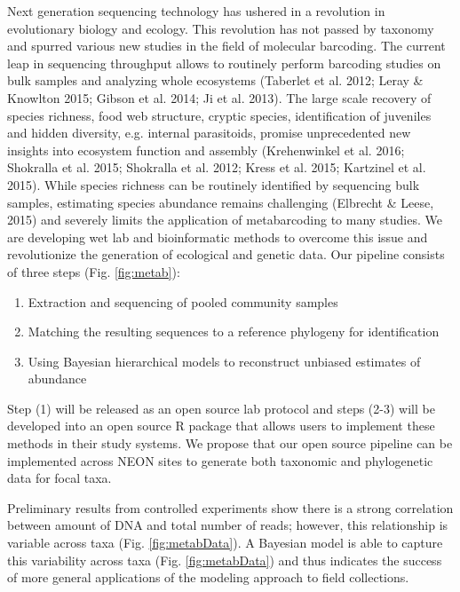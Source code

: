 \documentclass[11pt]{article}
\begin{document}
Next generation sequencing technology has ushered in a revolution in
evolutionary biology and ecology. This revolution has not passed by
taxonomy and spurred various new studies in the field of molecular
barcoding. The current leap in sequencing throughput allows to
routinely perform barcoding studies on bulk samples and analyzing
whole ecosystems (Taberlet et al. 2012; Leray \& Knowlton 2015; Gibson
et al. 2014; Ji et al. 2013). The large scale recovery of species
richness, food web structure, cryptic species, identification of
juveniles and hidden diversity, e.g. internal parasitoids, promise
unprecedented new insights into ecosystem function and assembly
(Krehenwinkel et al. 2016; Shokralla et al. 2015; Shokralla et
al. 2012; Kress et al. 2015; Kartzinel et al. 2015). While species
richness can be routinely identified by sequencing bulk samples,
estimating species abundance remains challenging (Elbrecht \& Leese,
2015) and severely limits the application of metabarcoding to many
studies. We are developing wet lab and bioinformatic methods to
overcome this issue and revolutionize the generation of ecological and
genetic data. Our pipeline consists of three steps
(Fig. \ref{fig:metab}):

\begin{enumerate}
\item Extraction and sequencing of pooled community samples
\item Matching the resulting sequences to a reference phylogeny for
  identification
\item Using Bayesian hierarchical models to reconstruct unbiased
  estimates of abundance
\end{enumerate}

Step (1) will be released as an open source lab protocol and steps
(2-3) will be developed into an open source R package that allows
users to implement these methods in their study systems.  We propose
that our open source pipeline can be implemented across NEON sites to
generate both taxonomic and phylogenetic data for focal taxa.



Preliminary results from controlled experiments show there is a strong
correlation between amount of DNA and total number of reads; however,
this relationship is variable across taxa
(Fig. \ref{fig:metabData}). A Bayesian model is able to capture this
variability across taxa (Fig. \ref{fig:metabData}) and thus indicates
the success of more general applications of the modeling approach to
field collections.
\end{document}
